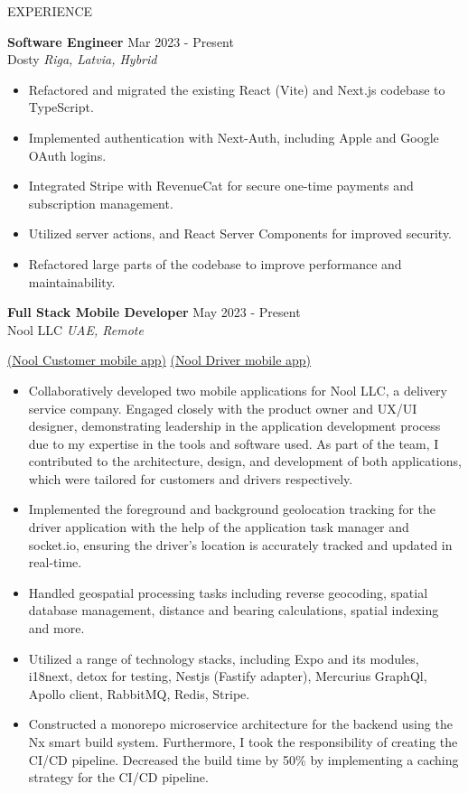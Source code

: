 \documentclass{resume} %
\begin{document}
\begin{rSection}{EXPERIENCE}

\textbf{Software Engineer} \hfill Mar 2023 - Present\\
Dosty \hfill \textit{Riga, Latvia, Hybrid}
 \begin{itemize}
    \itemsep -3pt {} 
        \item Refactored and migrated the existing React (Vite) and Next.js codebase to TypeScript.
        \item Implemented authentication with Next-Auth, including Apple and Google OAuth logins.
        \item Integrated Stripe with RevenueCat for secure one-time payments and subscription management.
        \item Utilized server actions, and React Server Components for improved security.
        \item Refactored large parts of the codebase to improve performance and maintainability.
 \end{itemize}

\textbf{Full Stack Mobile Developer} \hfill May 2023 - Present\\
Nool LLC \hfill \textit{UAE, Remote}

\href{https://apps.apple.com/us/app/nool/id6478508548}{(Nool Customer mobile app)}
\href{https://apps.apple.com/us/app/nool-driver/id6478509151}{(Nool Driver mobile app)}
 \begin{itemize}
    \itemsep -3pt {} 
        \item Collaboratively developed two mobile applications for Nool LLC, a delivery service company. Engaged closely with the product owner and UX/UI designer, demonstrating leadership in the application development process due to my expertise in the tools and software used. As part of the team, I contributed to the architecture, design, and development of both applications, which were tailored for customers and drivers respectively.
        \item Implemented the foreground and background geolocation tracking for the driver application with the help of the application task manager and socket.io, ensuring the driver's location is accurately tracked and updated in real-time.
        \item Handled geospatial processing tasks including reverse geocoding, spatial database management, distance and bearing calculations, spatial indexing and more.
        \item Utilized a range of technology stacks, including Expo and its modules, i18next, detox for testing, Nestjs (Fastify adapter), Mercurius GraphQl, Apollo client, RabbitMQ, Redis, Stripe.
        \item Constructed a monorepo microservice architecture for the backend using the Nx smart build system. Furthermore, I took the responsibility of creating the CI/CD pipeline. Decreased the build time by 50\% by implementing a caching strategy for the CI/CD pipeline.
 \end{itemize}


\end{rSection}
\end{document}
